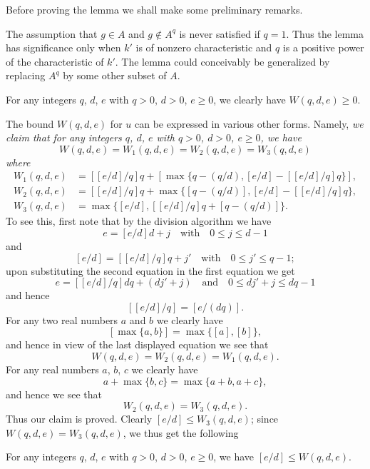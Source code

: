 Before proving the lemma we shall make some preliminary remarks.

\begin{remark}\label{art01-rem1}
The assumption that $g\in A$ and $g\not\in A^{q}$ is never satisfied if $q=1$. Thus the lemma has significance only when $k'$ is of nonzero characteristic and $q$ is a positive power of the characteristic of $k'$. The lemma could conceivably be generalized by replacing $A^{q}$ by some other subset of $A$.
\end{remark}

\begin{remark}\label{art01-rem2}
For any integers $q$, $d$, $e$ with $q>0$, $d>0$, $e\geq 0$, we clearly have $W(q,d,e)\geq 0$.
\end{remark}

\begin{remark}\label{art01-rem3}
The bound $W(q,d,e)$ for $u$ can be expressed in various other forms. Namely, {\em we claim that for any integers $q$, $d$, $e$ with $q>0$, $d>0$, $e\geq 0$, we have}
$$
W(q,d,e)=W_{1}(q,d,e)=W_{2}(q,d,e)=W_{3}(q,d,e)
$$
{\em where}
\begin{align*}
W_{1}(q,d,e) &= [[e/d]/q]q+[\max\{q-(q/d),[e/d]-[[e/d]/q]q\}],\\
W_{2}(q,d,e) &= [[e/d]/q]q+\max \{[q-(q/d)],[e/d]-[[e/d]/q]q\},\\
W_{3}(q,d,e) &= \max \{[e/d],[[e/d]/q]q+[q-(q/d)]\}.
\end{align*}
To see this, first note that by the division algorithm we have
$$
e=[e/d]d+j\text{~~ with~~ } 0\leq j\leq d-1
$$
and
$$
[e/d]=[[e/d]/q]q+j'\text{~~ with~~ } 0\leq j'\leq q-1;
$$
upon substituting the second equation in the first equation we get 
$$
e=[[e/d]/q]dq+(dj'+j)\text{~~ and~~ } 0\leq dj'+j\leq dq-1
$$
and hence
$$
[[e/d]/q]=[e/(dq)].
$$\pageoriginale
For any two real numbers $a$ and $b$ we clearly have 
$$
[\max \{a,b\}]=\max \{[a],[b]\},
$$ 
and hence in view of the last displayed equation we see that
$$
W(q,d,e)=W_{2}(q,d,e)=W_{1}(q,d,e).
$$
For any real numbers $a$, $b$, $c$ we clearly have
$$
a+\max \{b,c\}=\max \{a+b,a+c\},
$$
and hence we see that
$$
W_{2}(q,d,e)=W_{3}(q,d,e).
$$
Thus our claim is proved. Clearly $[e/d]\leq W_{3}(q,d,e)$; since $W(q,d,e)=W_{3}(q,d,e)$, we thus get the following
\end{remark}

\begin{remark}\label{art01-rem4}
For any integers $q$, $d$, $e$ with $q>0$, $d>0$, $e\geq 0$, we have $[e/d]\leq W(q,d,e)$.
\end{remark}


